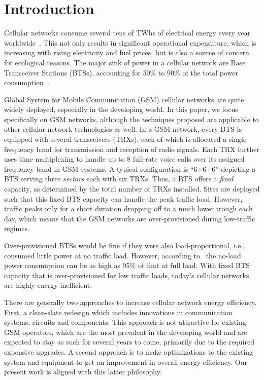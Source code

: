 \section{Introduction}
\label{sec:intro} 
Cellular networks consume several tens of TWhs of electrical energy
every year worldwide~\cite{Oh:Comm:2011}. This not only results
in significant operational expenditure, which is increasing with
rising electricity and fuel prices, but is also a source of concern
for ecological reasons. The major sink of power in a cellular network are Base
Transceiver Stations (BTSs), accounting for 50\% to 90\% of
the total power
consumption~\cite{Louhi:2007:BTSPower:INTELEC,Oh:Comm:2011}.

Global System for Mobile Communication (GSM) cellular networks are quite widely deployed, especially in the developing world. In this paper, we focus specifically on GSM networks, although the techniques proposed are applicable to other cellular network technologies as well. In a GSM network, every BTS is equipped with several transceivers (TRXs), each of
which is allocated a single frequency band for transmission and
reception of radio signals. Each TRX further uses time
multiplexing to handle up to 8 full-rate voice calls over its
assigned frequency band in GSM systems. A typical configuration
is ``6+6+6'' depicting a BTS serving three \textit{sectors}
each with six TRXs. Thus, a BTS offers a \textit{fixed} capacity, as
determined by the total number of TRXs installed. Sites are
deployed such that this fixed BTS capacity can handle the peak
traffic load. However, traffic peaks only for a short duration
dropping off to a much lower trough each day, which means that
the GSM networks are over-provisioned during
low-traffic regimes.

Over-provisioned BTSs would be fine if they were also
load-proportional, i.e., consumed little power at no traffic
load. However, according to~\cite{Peng:2011:BTSSaving:Mobicom}
the no-load power consumption can be as high as 95\% of that at
full load. With fixed BTS capacity that is over-provisioned for
low traffic loads, today's cellular networks are highly energy inefficient.

There are generally two approaches to increase cellular network
energy efficiency. First, a clean-slate redesign which includes
innovations in communication systems, circuits and components.
This approach is not attractive for existing GSM operators,
which are the most prevalent in the developing world and are
expected to stay as such for several years to come, primarily due to the required expensive upgrades. 
A second approach is to make optimizations to the existing system
and equipment to get an improvement in overall energy
efficiency. Our present work is aligned with this latter
philosophy.

